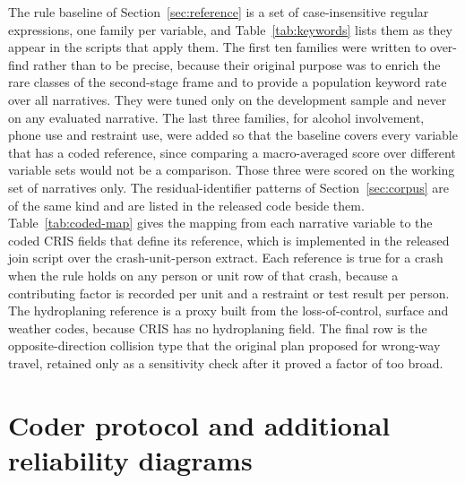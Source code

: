The rule baseline of Section~\ref{sec:reference} is a set of case-insensitive regular
expressions, one family per variable, and Table~\ref{tab:keywords} lists them as they appear
in the scripts that apply them. The first ten families were written to over-find rather than
to be precise, because their original purpose was to enrich the rare classes of the
second-stage frame and to provide a population keyword rate over all \Ncorpus{} narratives.
They were tuned only on the development sample and never on any evaluated narrative. The
last three families, for alcohol involvement, phone use and restraint use, were added so that
the baseline covers every variable that has a coded reference, since comparing a
macro-averaged score over different variable sets would not be a comparison. Those three
were scored on the working set of narratives only. The residual-identifier patterns of
Section~\ref{sec:corpus} are of the same kind and are listed in the released code beside
them. Table~\ref{tab:coded-map} gives the mapping from each narrative variable to the coded
CRIS fields that define its reference, which is implemented in the released join script over
the crash-unit-person extract. Each reference is true for a crash when the rule holds on any
person or unit row of that crash, because a contributing factor is recorded per unit and a
restraint or test result per person. The hydroplaning reference is a proxy built from the
loss-of-control, surface and weather codes, because CRIS has no hydroplaning field. The
final row is the opposite-direction collision type that the original plan proposed for
wrong-way travel, retained only as a sensitivity check after it proved a factor of
\WrongWayProxyRatio{} too broad.




\section{Coder protocol and additional reliability diagrams}
\label{app:coders}
\setcounter{table}{0}\setcounter{figure}{0}\setcounter{equation}{0}

